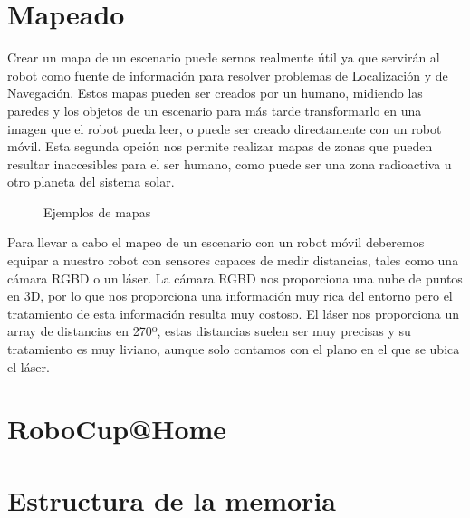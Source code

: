 \section{Mapeado}
\label{cap:mapeado}
Crear un mapa de un escenario puede sernos realmente útil ya que servirán al robot como fuente de información para resolver problemas de Localización y de Navegación. Estos mapas pueden ser creados por un humano, midiendo las paredes y los objetos de un escenario para más tarde transformarlo en una imagen que el robot pueda leer, o puede ser creado directamente con un robot móvil. Esta segunda opción nos permite realizar mapas de zonas que pueden resultar inaccesibles para el ser humano, como puede ser una zona radioactiva u otro planeta del sistema solar.

\begin{figure}[hbtp]
  \begin{center}
  \end{center}
  \caption{Ejemplos de mapas}
  \label{fig:maps-ej}
\end{figure}
Para llevar a cabo el mapeo de un escenario con un robot móvil deberemos equipar a nuestro robot con sensores capaces de medir distancias, tales como una cámara RGBD o un láser. La cámara RGBD nos proporciona una nube de puntos en 3D, por lo que nos proporciona una información muy rica del entorno pero el tratamiento de esta información resulta muy costoso. El láser nos proporciona un array de distancias en 270º, estas distancias suelen ser muy precisas y su tratamiento es muy liviano, aunque solo contamos con el plano en el que se ubica el láser. 




\section{RoboCup@Home}
\label{cap:robocup}

\section{Estructura de la memoria}
\label{cap:estructuradelamemoria}


